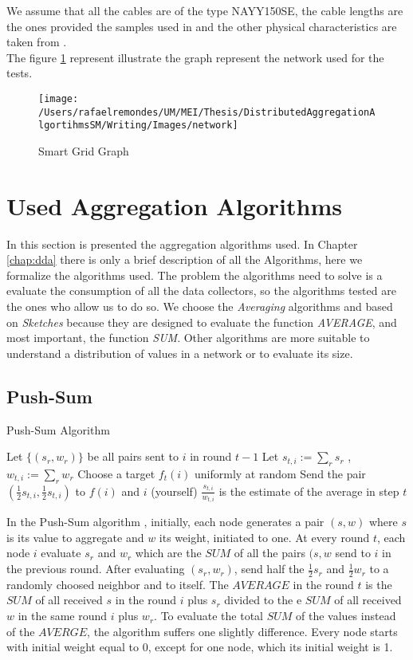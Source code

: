 We assume that all the cables are of the type NAYY150SE, the cable lengths are the ones  provided the samples used in \cite{pagani2013grid} and the other physical characteristics are taken from \cite{lampe2011cooperative}.\\
The figure \ref{fig:network} represent illustrate the graph represent the network used for the tests.
\begin{figure}[h]
\centering
\texttt{[image: /Users/rafaelremondes/UM/MEI/Thesis/DistributedAggregationAlgortihmsSM/Writing/Images/network]}
\caption{\label{fig:network}  Smart Grid Graph}
\end{figure}

\section{Used Aggregation Algorithms}
In this section is presented the aggregation algorithms used. In Chapter \ref{chap:dda}  there is only  a brief description of all the Algorithms, here we formalize the algorithms used. The problem the algorithms need to solve is a evaluate the consumption of all the data collectors, so the algorithms tested are the ones who allow us to do so. We choose the \textit{Averaging} algorithms and based on \textit{Sketches} because they are designed to evaluate the function \textit{AVERAGE}, and most important, the function \textit{SUM}. Other algorithms are more suitable to understand a distribution of values in a network or to evaluate  its size.\\
\subsection{Push-Sum}
\begin{algorithm}
\caption{Push-Sum Algorithm}
\begin{algorithmic}[1]
\STATE Let $\{ (s_r,w_r)\}$ be all pairs sent to $i$ in round $t-1$
\STATE Let $s_{t,i} :=  \sum_{r} s_r$ , $w_{t,i} := \sum_{r} w_r$
\STATE Choose a target $f_t(i)$ uniformly at random
\STATE Send the pair $ \left(  \frac{1}{2} s_{t,i} ,  \frac{1}{2} s_{t,i}  \right) $ to $f(i)$ and $i$ (yourself)
\STATE $\frac{s_{t,i}}{w_{t,i}}$ is the estimate of the average in step $t$
\end{algorithmic}
\end{algorithm}
In the Push-Sum algorithm \cite{kempe2003gossip}, initially, each node generates a pair $(s,w)$ where $s$ is its value to aggregate and $w$ its weight, initiated to one. At every round $t$, each node $i$ evaluate $s_r$ and $w_r$ which are the $SUM$ of all the pairs $(s,w$ send to $i$ in the previous round. After evaluating $(s_r,w_r)$, send half the $\frac{1}{2}s_r$ and  $\frac{1}{2}w_r$ to a randomly choosed neighbor and to itself. The $AVERAGE$ in the round $t$ is the $SUM$ of all received $s$ in the round $i$ plus $s_r$ divided to the e $SUM$ of all received $w$ in the same round $i$ plus $w_r$. To evaluate the total $SUM$ of the values instead of the $AVERGE$, the algorithm suffers one slightly difference. Every node starts with initial weight equal to 0, except for one node, which its initial weight is 1.
